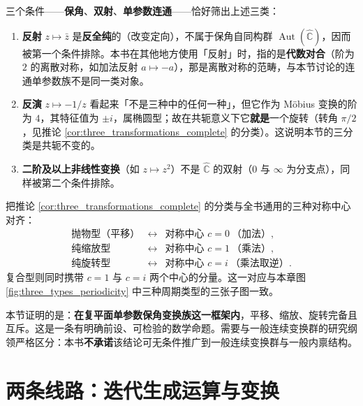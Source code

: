 \begin{remark}[为什么不是反射或反演]\label{rem:why_not_reflection}
三个条件——\textbf{保角}、\textbf{双射}、\textbf{单参数连通}——恰好筛出上述三类：
\begin{enumerate}[label=(\roman*)]
    \item \textbf{反射} $z\mapsto\bar z$ 是\textbf{反全纯}的（改变定向），不属于保角自同构群 $\operatorname{Aut}(\hat{\mathbb C})$，因而被第一个条件排除。本书在其他地方使用「反射」时，指的是\textbf{代数对合}（阶为 $2$ 的离散对称，如加法反射 $a\mapsto-a$），那是离散对称的范畴，与本节讨论的连通单参数族不是同一类对象。
    \item \textbf{反演} $z\mapsto-1/z$ 看起来「不是三种中的任何一种」，但它作为 Möbius 变换的阶为 $4$，其特征值为 $\pm i$，属椭圆型；故在共轭意义下它\textbf{就是}一个旋转（转角 $\pi/2$，见推论 \ref{cor:three_transformations_complete} 的分类）。这说明本节的三分类是共轭不变的。
    \item \textbf{二阶及以上非线性变换}（如 $z\mapsto z^2$）不是 $\hat{\mathbb C}$ 的双射（$0$ 与 $\infty$ 为分支点），同样被第二个条件排除。
\end{enumerate}
\end{remark}

\begin{remark}[与三种对称中心的对应]\label{rem:completeness_three_centres}
把推论 \ref{cor:three_transformations_complete} 的分类与全书通用的三种对称中心对齐：
\[
\begin{array}{lll}
\text{抛物型（平移）} & \longleftrightarrow & \text{对称中心 } c=0\ \text{（加法）},\\[2pt]
\text{纯缩放型} & \longleftrightarrow & \text{对称中心 } c=1\ \text{（乘法）},\\[2pt]
\text{纯旋转型} & \longleftrightarrow & \text{对称中心 } c=i\ \text{（乘法取逆）}.
\end{array}
\]
复合型则同时携带 $c=1$ 与 $c=i$ 两个中心的分量。这一对应与本章图 \ref{fig:three_types_periodicity} 中三种周期类型的三张子图一致。
\end{remark}

\begin{remark}[本节的适用边界]\label{rem:completeness_boundary}
本节证明的是：\textbf{在复平面单参数保角变换族这一框架内}，平移、缩放、旋转完备且互斥。这是一条有明确前设、可检验的数学命题。需要与一般连续变换群的研究纲领严格区分：本书\textbf{不承诺}该结论可无条件推广到一般连续变换群与一般内禀结构。
\end{remark}

\section{两条线路：迭代生成运算与变换}
\label{sec:two_lines}


